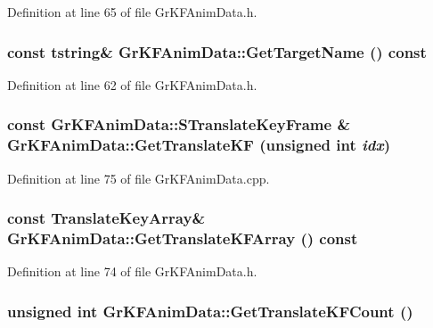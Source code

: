 Definition at line 65 of file GrKFAnimData.h.\hypertarget{class_gr_k_f_anim_data_b6567627550f063030476e6bd58fb72b}{
\subsubsection[{GetTargetName}]{\setlength{\rightskip}{0pt plus 5cm}const {\bf tstring}\& GrKFAnimData::GetTargetName () const}}
\label{class_gr_k_f_anim_data_b6567627550f063030476e6bd58fb72b}




Definition at line 62 of file GrKFAnimData.h.\hypertarget{class_gr_k_f_anim_data_bf3fbd8ffab0b28a70a13cbe571fd267}{
\subsubsection[{GetTranslateKF}]{\setlength{\rightskip}{0pt plus 5cm}const {\bf GrKFAnimData::STranslateKeyFrame} \& GrKFAnimData::GetTranslateKF (unsigned int {\em idx})}}
\label{class_gr_k_f_anim_data_bf3fbd8ffab0b28a70a13cbe571fd267}




Definition at line 75 of file GrKFAnimData.cpp.\hypertarget{class_gr_k_f_anim_data_12bc47bbcae2a4b2f6c1e2752f5892fc}{
\subsubsection[{GetTranslateKFArray}]{\setlength{\rightskip}{0pt plus 5cm}const {\bf TranslateKeyArray}\& GrKFAnimData::GetTranslateKFArray () const}}
\label{class_gr_k_f_anim_data_12bc47bbcae2a4b2f6c1e2752f5892fc}




Definition at line 74 of file GrKFAnimData.h.\hypertarget{class_gr_k_f_anim_data_5a804a1ef5236f33533f2c42e4d47589}{
\subsubsection[{GetTranslateKFCount}]{\setlength{\rightskip}{0pt plus 5cm}unsigned int GrKFAnimData::GetTranslateKFCount ()}}
\label{class_gr_k_f_anim_data_5a804a1ef5236f33533f2c42e4d47589}




